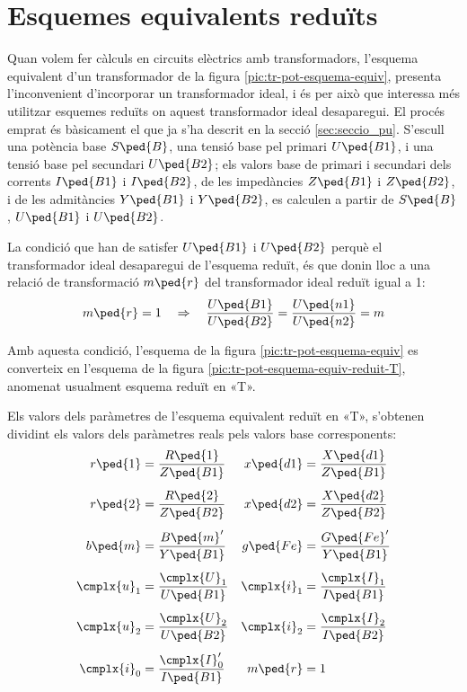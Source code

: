 \section{Esquemes equivalents reduïts}

Quan  volem fer càlculs en circuits elèctrics amb transformadors, l'esquema equivalent d'un transformador de la figura  \vref{pic:tr-pot-esquema-equiv}, presenta l'inconvenient d'incorporar un transformador ideal, i és per això que interessa més utilitzar esquemes reduïts on aquest transformador ideal desaparegui.
El procés emprat és bàsicament el que ja s'ha descrit en la secció \vref{sec:seccio_pu}. S'escull una potència base $S\ped{B}$, una tensió base pel primari $U\ped{B1}$, i una tensió base pel secundari $U\ped{B2}$; els valors base de primari i secundari dels corrents $I\ped{B1}$ i $I\ped{B2}$, de les impedàncies $Z\ped{B1}$ i $Z\ped{B2}$, i de les admitàncies $Y\ped{B1}$ i $Y\ped{B2}$, es calculen a partir de $S\ped{B}$, $U\ped{B1}$ i $U\ped{B2}$.

La condició que han de satisfer $U\ped{B1}$ i $U\ped{B2}$ perquè el transformador ideal desaparegui de l'esquema reduït, és que donin lloc a una relació de transformació $m\ped{r}$ del transformador ideal reduït igual a  1:
\begin{equation}\label{eq:mr}
    m\ped{r} = 1 \quad \Rightarrow \quad \frac{U\ped{B1}}{U\ped{B2}} = \frac{U\ped{n1}}{U\ped{n2}} = m
\end{equation}

 Amb aquesta condició, l'esquema de la figura \vref{pic:tr-pot-esquema-equiv} es converteix en l'esquema de la figura
\vref{pic:tr-pot-esquema-equiv-reduit-T}, anomenat usualment esquema reduït en «T».

\begin{center}
    
    \label{pic:tr-pot-esquema-equiv-reduit-T}
\end{center}

Els valors dels paràmetres de l'esquema equivalent reduït en «T», s'obtenen dividint els valors dels paràmetres reals pels valors base corresponents:
\begin{align}
    r\ped{1} &=\frac{R\ped{1}}{Z\ped{B1}} &   x\ped{d1} &=\frac{X\ped{d1}}{Z\ped{B1}} \\[1ex]
    r\ped{2} &=\frac{R\ped{2}}{Z\ped{B2}} &   x\ped{d2} &=\frac{X\ped{d2}}{Z\ped{B2}} \\[1ex]
    b\ped{m} &=\frac{B\ped{m}'}{Y\ped{B1}}  &   g\ped{Fe} &=\frac{G\ped{Fe}'}{Y\ped{B1}} \\[1ex]
    \cmplx{u}_1 &=\frac{\cmplx{U}_1}{U\ped{B1}} &   \cmplx{i}_1 &=\frac{\cmplx{I}_1}{I\ped{B1}} \\[1ex]
    \cmplx{u}_2 &=\frac{\cmplx{U}_2}{U\ped{B2}} &   \cmplx{i}_2 &=\frac{\cmplx{I}_2}{I\ped{B2}} \\[1ex]
    \cmplx{i}_0 &=\frac{\cmplx{I}_0'}{I\ped{B1}} &   m\ped{r} &=1
\end{align}

